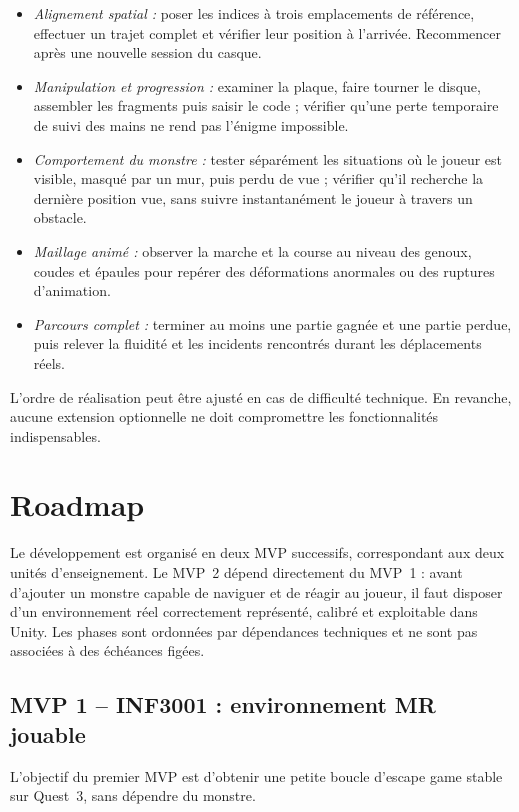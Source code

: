 \documentclass[11pt,a4paper]{article}
\begin{document}
\begin{itemize}
    \item \emph{Alignement spatial :} poser les indices à trois emplacements de référence, effectuer un trajet complet et vérifier leur position à l'arrivée. Recommencer après une nouvelle session du casque.
    \item \emph{Manipulation et progression :} examiner la plaque, faire tourner le disque, assembler les fragments puis saisir le code ; vérifier qu'une perte temporaire de suivi des mains ne rend pas l'énigme impossible.
    \item \emph{Comportement du monstre :} tester séparément les situations où le joueur est visible, masqué par un mur, puis perdu de vue ; vérifier qu'il recherche la dernière position vue, sans suivre instantanément le joueur à travers un obstacle.
    \item \emph{Maillage animé :} observer la marche et la course au niveau des genoux, coudes et épaules pour repérer des déformations anormales ou des ruptures d'animation.
    \item \emph{Parcours complet :} terminer au moins une partie gagnée et une partie perdue, puis relever la fluidité et les incidents rencontrés durant les déplacements réels.
\end{itemize}

L'ordre de réalisation peut être ajusté en cas de difficulté technique. En revanche, aucune extension optionnelle ne doit compromettre les fonctionnalités indispensables.

\section{Roadmap}

Le développement est organisé en deux MVP successifs, correspondant aux deux unités d'enseignement. Le MVP~2 dépend directement du MVP~1 : avant d'ajouter un monstre capable de naviguer et de réagir au joueur, il faut disposer d'un environnement réel correctement représenté, calibré et exploitable dans Unity. Les phases sont ordonnées par dépendances techniques et ne sont pas associées à des échéances figées.

\subsection*{MVP 1 -- INF3001 : environnement MR jouable}

L'objectif du premier MVP est d'obtenir une petite boucle d'escape game stable sur Quest~3, sans dépendre du monstre.
\end{document}
